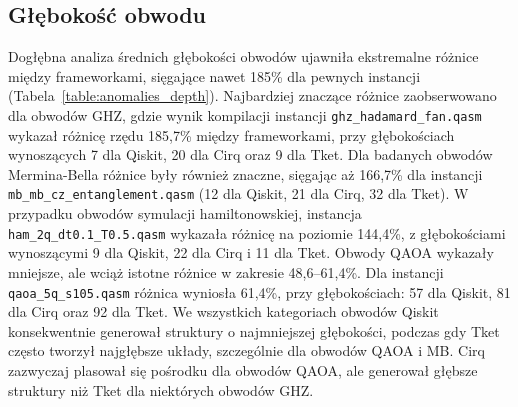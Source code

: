 \subsection{Głębokość obwodu}
Dogłębna analiza średnich głębokości obwodów ujawniła ekstremalne różnice między frameworkami, sięgające nawet 185\% dla pewnych instancji (Tabela~\ref{table:anomalies_depth}). Najbardziej znaczące różnice zaobserwowano dla obwodów GHZ, gdzie wynik kompilacji instancji \texttt{ghz\_hadamard\_fan.qasm} wykazał różnicę rzędu 185,7\% między frameworkami, przy głębokościach wynoszących 7 dla Qiskit, 20 dla Cirq oraz 9 dla Tket.
Dla badanych obwodów Mermina-Bella różnice były również znaczne, sięgając aż 166,7\% dla instancji \texttt{mb\_mb\_cz\_entanglement.qasm} (12 dla Qiskit, 21 dla Cirq, 32 dla Tket). W przypadku obwodów symulacji hamiltonowskiej, instancja \texttt{ham\_2q\_dt0.1\_T0.5.qasm} wykazała różnicę na poziomie 144,4\%, z głębokościami wynoszącymi 9 dla Qiskit, 22 dla Cirq i 11 dla Tket.
Obwody QAOA wykazały mniejsze, ale wciąż istotne różnice w zakresie 48,6--61,4\%. Dla instancji \texttt{qaoa\_5q\_s105.qasm} różnica wyniosła 61,4\%, przy głębokościach: 57 dla Qiskit, 81 dla Cirq oraz 92 dla Tket. 
We wszystkich kategoriach obwodów Qiskit konsekwentnie generował struktury o najmniejszej głębokości, podczas gdy Tket często tworzył najgłębsze układy, szczególnie dla obwodów QAOA i MB. Cirq zazwyczaj plasował się pośrodku dla obwodów QAOA, ale generował głębsze struktury niż Tket dla niektórych obwodów GHZ.


